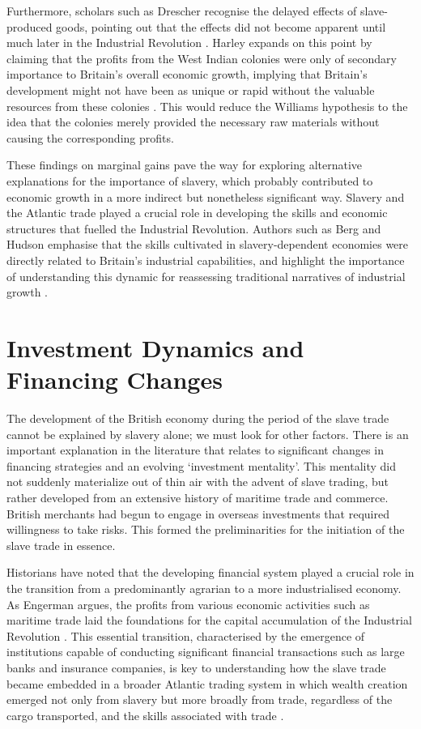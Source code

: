 \documentclass[a4paper,11pt]{article}
\begin{document}
Furthermore, scholars such as Drescher recognise the delayed effects of slave-produced goods, pointing out that the effects did not become apparent until much later in the Industrial Revolution \citep{drescher1997}. Harley expands on this point by claiming that the profits from the West Indian colonies were only of secondary importance to Britain's overall economic growth, implying that Britain's development might not have been as unique or rapid without the valuable resources from these colonies \citep{harley2015}. This would reduce the Williams hypothesis to the idea that the colonies merely provided the necessary raw materials without causing the corresponding profits.

These findings on marginal gains pave the way for exploring alternative explanations for the importance of slavery, which probably contributed to economic growth in a more indirect but nonetheless significant way. Slavery and the Atlantic trade played a crucial role in developing the skills and economic structures that fuelled the Industrial Revolution. Authors such as Berg and Hudson emphasise that the skills cultivated in slavery-dependent economies were directly related to Britain's industrial capabilities, and highlight the importance of understanding this dynamic for reassessing traditional narratives of industrial growth \citep{berghudson2021}.

\section{Investment Dynamics and Financing Changes}

The development of the British economy during the period of the slave trade cannot be explained by slavery alone; we must look for other factors. There is an important explanation in the literature that relates to significant changes in financing strategies and an evolving ‘investment mentality’. This mentality did not suddenly materialize out of thin air with the advent of slave trading, but rather developed from an extensive history of maritime trade and commerce. British merchants had begun to engage in overseas investments that required willingness to take risks. This formed the preliminarities for the initiation of the slave trade in essence.

Historians have noted that the developing financial system played a crucial role in the transition from a predominantly agrarian to a more industrialised economy. As Engerman argues, the profits from various economic activities such as maritime trade laid the foundations for the capital accumulation of the Industrial Revolution \citep{eltisengerman2000}. This essential transition, characterised by the emergence of institutions capable of conducting significant financial transactions such as large banks and insurance companies, is key to understanding how the slave trade became embedded in a broader Atlantic trading system in which wealth creation emerged not only from slavery but more broadly from trade, regardless of the cargo transported, and the skills associated with trade \citep{solow1985}.
\end{document}
